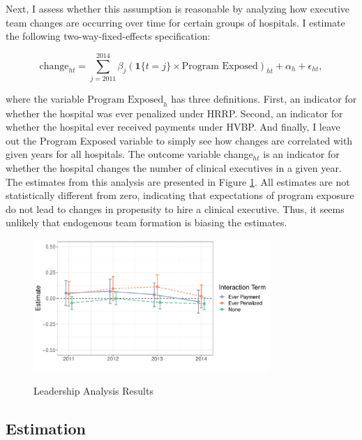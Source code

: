 \documentclass[12pt]{article}
\begin{document}
    Next, I assess whether this assumption is reasonable by analyzing how executive team changes are occurring over time for certain groups of hospitals. I estimate the following two-way-fixed-effects specification:

    \begin{equation}\label{eq:change2}
    \text{change}_{ht} = \sum_{j=2011}^{2014}\beta_j(\mathbf{1}\{t=j\}\times \text{Program Exposed})_{ht} + \alpha_h + \epsilon_{ht},
    \end{equation}

    where the variable $\text{Program Exposed}_{h}$ has three definitions. First, an indicator for whether the hospital was ever penalized under HRRP. Second, an indicator for whether the hospital ever received payments under HVBP. And finally, I leave out the Program Exposed variable to simply see how changes are correlated with given years for all hospitals. The outcome variable change$_{ht}$ is an indicator for whether the hospital changes the number of clinical executives in a given year. The estimates from this analysis are presented in Figure \ref{fig:change_analysis}. All estimates are not statistically different from zero, indicating that expectations of program exposure do not lead to changes in propensity to hire a clinical executive. Thus, it seems unlikely that endogenous team formation is biasing the estimates. 

     \begin{figure}[ht!]
         \centering
         \caption{Leadership Analysis Results}
         \includegraphics[width=0.8\textwidth]{Objects/change_analysis_plot.pdf}
         \label{fig:change_analysis}
     \end{figure}

     \subsection{Estimation}\label{sec:decomp}
\end{document}
